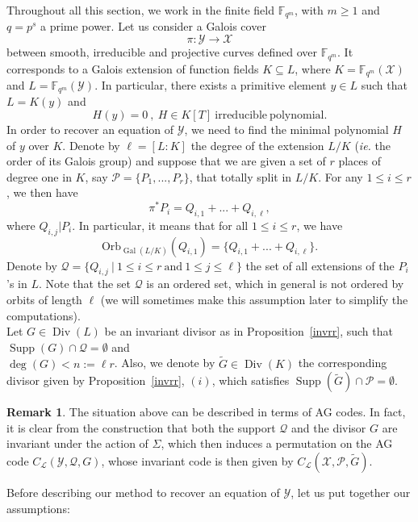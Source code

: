 \documentclass[10pt]{article}
\theoremstyle{definition}
\newtheorem{rq1}[thm]{Remark}
\theoremstyle{definition}
\theoremstyle{definition}
\newcommand{\Fqm}{\mathbb{F}_{q^m}}
\newcommand{\su}{\subseteq}
\newcommand{\X}{\mathcal{X}}
\newcommand{\Y}{\mathcal{Y}}
\newcommand{\PR}{\mathcal{P}}
\newcommand{\QR}{\mathcal{Q}}
\newcommand{\Div}{\operatorname{Div}}
\newcommand{\Supp}{\operatorname{Supp}}
\newcommand{\Gal}{\operatorname{Gal}}
\newcommand{\calL}{\mathcal{L}}
\begin{document}
Throughout all this section, we work in the finite field $\Fqm$, with $m \geq 1$ and $q=p^s$ a prime power. Let us consider a Galois cover 
\[\pi : \Y \longrightarrow \X\]
between smooth, irreducible and projective curves defined over $\Fqm$. It corresponds to a Galois extension of function fields $K \su L$,
where $K=\Fqm(\X)$ and $L=\Fqm(\Y)$. In particular, there exists a primitive element $y \in L$ such that $L=K(y)$ and
\[ H(y)=0 \ , \ H \in K[T] \ \mathrm{irreducible \ polynomial.}\]
In order to recover an equation of $\Y$, we need to find the minimal polynomial $H$ of $y$ over $K$. Denote by $\ell=[L:K]$ the degree of the extension $L/K$ (\textit{ie.} the order of its Galois group) and suppose that we are given a set of $r$ places of degree one in $K$, say $\PR = \{P_1,...,P_r\}$, that totally split in $L/K$. For any $1 \leq i \leq r$, we then have
\[\pi^*P_i = Q_{i,1} + ... + Q_{i,\ell},\]
where $Q_{i,j}|P_i$. In particular, it means that for all $1\leq i\leq r$, we have 
\[\mathrm{Orb}_{\Gal(L/K)}(Q_{i,1})=\{Q_{i,1} + ... + Q_{i,\ell}\}.\]
Denote by $\QR = \{Q_{i,j} \ | \ 1 \leq i \leq r \ \mathrm{and} \ 1 \leq j \leq \ell\}$ the set of all extensions of the $P_i$'s in $L$. Note that the set $\QR$ is an ordered set, which in general is not ordered by orbits of length $\ell$ (we will sometimes make this assumption later to simplify the computations). \\
Let $G \in \Div(L)$ be an invariant divisor as in Proposition~\ref{invrr}, such that $\Supp(G) \cap \QR = \emptyset$ and \\ $\deg(G)<n:=\ell r$. Also, we denote by $\tilde{G} \in \Div(K)$ the corresponding divisor given by Proposition~\ref{invrr}, $(i)$, which satisfies $\Supp(\tilde{G}) \cap \PR = \emptyset$. 

\begin{rq1} 
The situation above can be described in terms of AG codes. In fact, it is clear from the construction that both the support $\QR$ and the divisor $G$ are invariant under the action of $\Sigma$, which then induces a permutation on the AG code $C_{\calL}(\Y,\QR,G)$, whose invariant code is then given by $C_{\calL}(\X,\PR,\tilde{G})$. 
\end{rq1}

Before describing our method to recover an equation of $\Y$, let us put together our assumptions:
\end{document}
